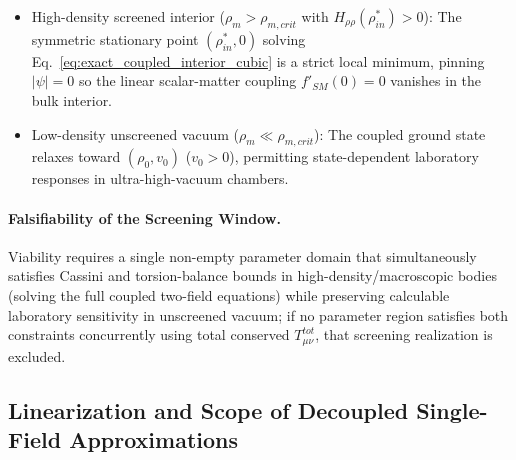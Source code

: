 \documentclass[american,11pt,letterpaper]{article}
\def\mathrm#1{#1}%
\def\emph#1{#1}%
\begin{document}
\begin{enumerate}[leftmargin=2em]
  \begin{itemize}
    \item \emph{High-density screened interior ($\rho_m > \rho_{m,\mathrm{crit}}$ with $H_{\rho\rho}(\rho_{\mathrm{in}}^*) > 0$):} The symmetric stationary point $(\rho_{\mathrm{in}}^*, 0)$ solving Eq.~\eqref{eq:exact_coupled_interior_cubic} is a strict local minimum, pinning $|\psi| = 0$ so the linear scalar-matter coupling $f'_{\mathrm{SM}}(0) = 0$ vanishes in the bulk interior.
    \item \emph{Low-density unscreened vacuum ($\rho_m \ll \rho_{m,\mathrm{crit}}$):} The coupled ground state relaxes toward $(\rho_0, v_0)$ ($v_0 > 0$), permitting state-dependent laboratory responses in ultra-high-vacuum chambers.
  \end{itemize}
\end{enumerate}

\paragraph{Falsifiability of the Screening Window.}
Viability requires a single non-empty parameter domain that simultaneously satisfies Cassini and torsion-balance bounds in high-density/macroscopic bodies (solving the full coupled two-field equations) while preserving calculable laboratory sensitivity in unscreened vacuum; if no parameter region satisfies both constraints concurrently using total conserved $T_{\mu\nu}^{\mathrm{tot}}$, that screening realization is excluded.

\subsection{Linearization and Scope of Decoupled Single-Field Approximations}
\end{document}
